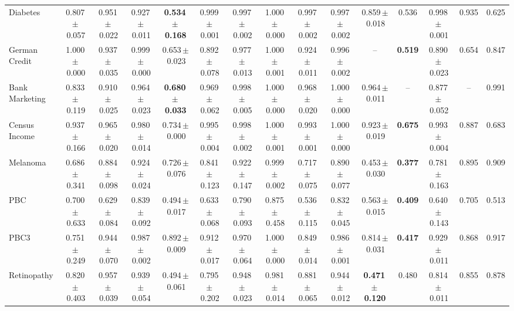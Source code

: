 \documentclass[8pt]{extarticle}
\begin{document}
\begin{longtable}{l*{14}{c}}
Diabetes & 0.807\,$\pm$\,0.057 & 0.951\,$\pm$\,0.022 & 0.927\,$\pm$\,0.011 & \textbf{0.534\,$\pm$\,0.168} & 0.999\,$\pm$\,0.001 & 0.997\,$\pm$\,0.002 & 1.000\,$\pm$\,0.000 & 0.997\,$\pm$\,0.002 & 0.997\,$\pm$\,0.002 & 0.859\,$\pm$\,0.018 & 0.536 & 0.998\,$\pm$\,0.001 & 0.935 & 0.625 \\
German Credit & 1.000\,$\pm$\,0.000 & 0.937\,$\pm$\,0.035 & 0.999\,$\pm$\,0.000 & 0.653\,$\pm$\,0.023 & 0.892\,$\pm$\,0.078 & 0.977\,$\pm$\,0.013 & 1.000\,$\pm$\,0.001 & 0.924\,$\pm$\,0.011 & 0.996\,$\pm$\,0.002 & -- & \textbf{0.519} & 0.890\,$\pm$\,0.023 & 0.654 & 0.847 \\
Bank Marketing & 0.833\,$\pm$\,0.119 & 0.910\,$\pm$\,0.025 & 0.964\,$\pm$\,0.023 & \textbf{0.680\,$\pm$\,0.033} & 0.969\,$\pm$\,0.062 & 0.998\,$\pm$\,0.005 & 1.000\,$\pm$\,0.000 & 0.968\,$\pm$\,0.020 & 1.000\,$\pm$\,0.000 & 0.964\,$\pm$\,0.011 & -- & 0.877\,$\pm$\,0.052 & -- & 0.991 \\
Census Income & 0.937\,$\pm$\,0.166 & 0.965\,$\pm$\,0.020 & 0.980\,$\pm$\,0.014 & 0.734\,$\pm$\,0.000 & 0.995\,$\pm$\,0.004 & 0.998\,$\pm$\,0.002 & 1.000\,$\pm$\,0.001 & 0.993\,$\pm$\,0.001 & 1.000\,$\pm$\,0.000 & 0.923\,$\pm$\,0.019 & \textbf{0.675} & 0.993\,$\pm$\,0.004 & 0.887 & 0.683 \\
Melanoma & 0.686\,$\pm$\,0.341 & 0.884\,$\pm$\,0.098 & 0.924\,$\pm$\,0.024 & 0.726\,$\pm$\,0.076 & 0.841\,$\pm$\,0.123 & 0.922\,$\pm$\,0.147 & 0.999\,$\pm$\,0.002 & 0.717\,$\pm$\,0.075 & 0.890\,$\pm$\,0.077 & 0.453\,$\pm$\,0.030 & \textbf{0.377} & 0.781\,$\pm$\,0.163 & 0.895 & 0.909 \\
PBC & 0.700\,$\pm$\,0.633 & 0.629\,$\pm$\,0.084 & 0.839\,$\pm$\,0.092 & 0.494\,$\pm$\,0.017 & 0.633\,$\pm$\,0.068 & 0.790\,$\pm$\,0.093 & 0.875\,$\pm$\,0.458 & 0.536\,$\pm$\,0.115 & 0.832\,$\pm$\,0.045 & 0.563\,$\pm$\,0.015 & \textbf{0.409} & 0.640\,$\pm$\,0.143 & 0.705 & 0.513 \\
PBC3 & 0.751\,$\pm$\,0.249 & 0.944\,$\pm$\,0.070 & 0.987\,$\pm$\,0.002 & 0.892\,$\pm$\,0.009 & 0.912\,$\pm$\,0.017 & 0.970\,$\pm$\,0.064 & 1.000\,$\pm$\,0.000 & 0.849\,$\pm$\,0.014 & 0.986\,$\pm$\,0.001 & 0.814\,$\pm$\,0.031 & \textbf{0.417} & 0.929\,$\pm$\,0.011 & 0.868 & 0.917 \\
Retinopathy & 0.820\,$\pm$\,0.403 & 0.957\,$\pm$\,0.039 & 0.939\,$\pm$\,0.054 & 0.494\,$\pm$\,0.061 & 0.795\,$\pm$\,0.202 & 0.948\,$\pm$\,0.023 & 0.981\,$\pm$\,0.014 & 0.881\,$\pm$\,0.065 & 0.944\,$\pm$\,0.012 & \textbf{0.471\,$\pm$\,0.120} & 0.480 & 0.814\,$\pm$\,0.011 & 0.855 & 0.878 \\

\end{longtable}
\end{document}
